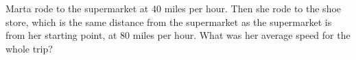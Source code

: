 Marta rode to the supermarket at $40$ miles per hour. Then she rode to the shoe store, which is the same distance from the supermarket as the supermarket is from her starting point, at $80$ miles per hour. What was her average speed for the whole trip?

